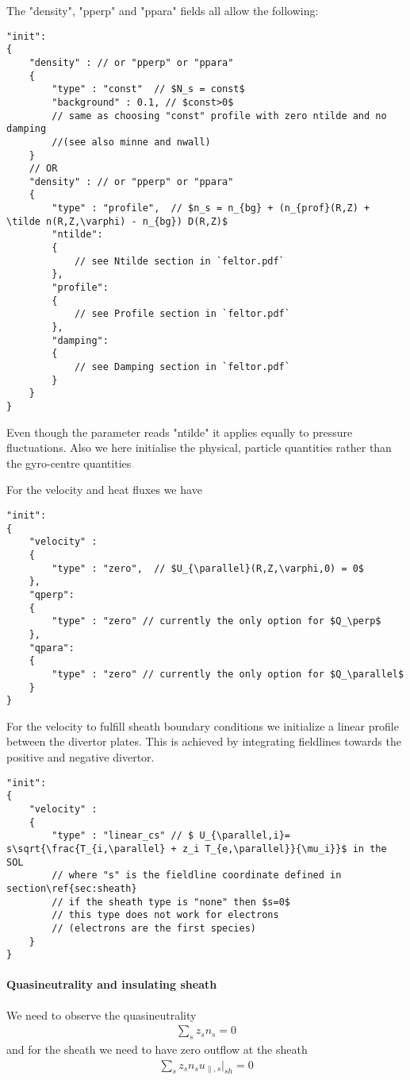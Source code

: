 \noindent
The "density", "pperp" and "ppara" fields all allow the following:
\begin{verbatim}
"init":
{
    "density" : // or "pperp" or "ppara"
    {
        "type" : "const"  // $N_s = const$
        "background" : 0.1, // $const>0$
        // same as choosing "const" profile with zero ntilde and no damping
        //(see also minne and nwall)
    }
    // OR
    "density" : // or "pperp" or "ppara"
    {
        "type" : "profile",  // $n_s = n_{bg} + (n_{prof}(R,Z) + \tilde n(R,Z,\varphi) - n_{bg}) D(R,Z)$
        "ntilde":
        {
            // see Ntilde section in `feltor.pdf`
        },
        "profile":
        {
            // see Profile section in `feltor.pdf`
        },
        "damping":
        {
            // see Damping section in `feltor.pdf`
        }
    }
}
\end{verbatim}
\begin{tcolorbox}[title=Note]
    Even though the parameter reads "ntilde" it applies equally to pressure fluctuations.
    Also we here initialise the physical, particle quantities rather than the gyro-centre quantities
\end{tcolorbox}
For the velocity and heat fluxes we have
\begin{verbatim}
"init":
{
    "velocity" :
    {
        "type" : "zero",  // $U_{\parallel}(R,Z,\varphi,0) = 0$
    },
    "qperp":
    {
        "type" : "zero" // currently the only option for $Q_\perp$
    },
    "qpara":
    {
        "type" : "zero" // currently the only option for $Q_\parallel$
    }
}
\end{verbatim}
\noindent
For the velocity to fulfill sheath boundary conditions we initialize a linear profile between the divertor plates.
This is achieved by integrating fieldlines towards the positive and negative divertor.
\begin{verbatim}
"init":
{
    "velocity" :
    {
        "type" : "linear_cs" // $ U_{\parallel,i}= s\sqrt{\frac{T_{i,\parallel} + z_i T_{e,\parallel}}{\mu_i}}$ in the SOL
        // where "s" is the fieldline coordinate defined in section\ref{sec:sheath}
        // if the sheath type is "none" then $s=0$
        // this type does not work for electrons
        // (electrons are the first species)
    }
}
\end{verbatim}
\noindent


\paragraph{Quasineutrality and insulating sheath}
We need to observe the quasineutrality
\begin{align}
\sum_s z_s n_s = 0
\end{align}
and for the sheath we need to have zero outflow at the sheath
\begin{align}
\sum_s z_s n_s u_{\parallel,s}|_{sh} = 0
\end{align}


